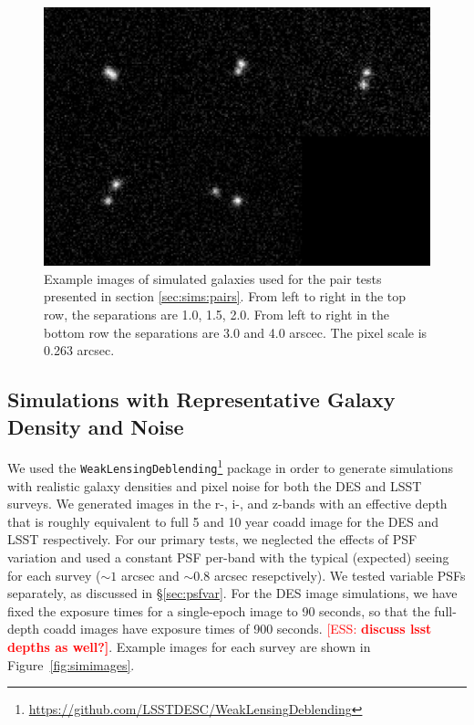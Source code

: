 \documentclass[fleqn,useAMS,usenatbib]{mnras}
\newcommand{\ess}[1]{\textcolor{red}{[ESS: \bf #1]}}
\begin{document}
\begin{figure}
    \includegraphics[width=\textwidth]{figures/bdk-comb.png}
    \caption{Example images of simulated galaxies used for the pair tests
    presented in section \ref{sec:sims:pairs}.  From left to right in the top row,
    the separations are 1.0, 1.5, 2.0. From left to right in the bottom row the
    separations are 3.0 and 4.0 arscec. The pixel scale is 0.263 arcsec.
    \label{fig:pairs}}
\end{figure}

\subsection{Simulations with Representative Galaxy Density and Noise}
\label{sec:sims:realgals}

We used the
\texttt{WeakLensingDeblending}\footnote{\url{https://github.com/LSSTDESC/WeakLensingDeblending}}
package in order to generate simulations with realistic galaxy densities and
pixel noise for both the DES and LSST surveys. We generated images in the r-,
i-, and z-bands with an effective depth that is roughly equivalent to full 5
and 10 year coadd image for the DES and LSST respectively. For our primary
tests, we neglected the effects of PSF variation and used a constant PSF
per-band with the typical (expected) seeing for each survey ($\sim\!1$ arcsec
and $\sim\!0.8$ arcsec resepctively). We tested variable PSFs separately, as
discussed in \S \ref{sec:psfvar}.  For the DES image simulations, we have fixed
the exposure times for a single-epoch image to 90 seconds, so that the
full-depth coadd images have exposure times of 900 seconds. \ess{discuss lsst
depths as well?}.  Example images for
each survey are shown in Figure~\ref{fig:simimages}.
\end{document}

